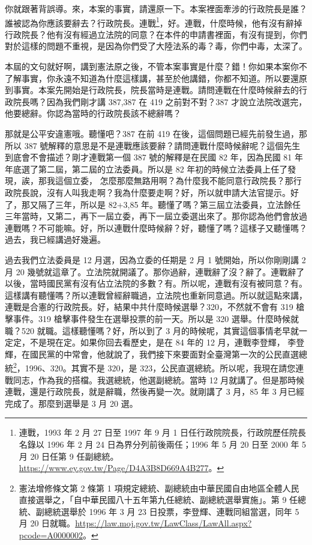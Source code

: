 \hypertarget{c08:cue:56}{}你就跟著背誤導。來，本案的事實，請還原一下。本案裡面牽涉的行政院長是誰？誰被認為你應該要辭去？行政院長。連戰\footnote{連戰，1993 年 2 月 27 日至 1997 年 9 月 1 日任行政院院長，行政院歷任院長名錄以 1996 年 2 月 24 日為界分列前後兩任；1996 年 5 月 20 日至 2000 年 5 月 20 日任第 9 任副總統。\url{https://www.ey.gov.tw/Page/D4A3B8D669A4B277}。}，好。連戰，什麼時候，他有沒有辭掉行政院長？他有沒有經過立法院的同意？在本件的申請書裡面，有沒有提到，你們對於這樣的問題不重視，是因為你們受了大陸法系的毒？毒，你們中毒，太深了。

\hypertarget{c08:cue:57}{}本屆的文句就好啊，講到憲法原之後，不管本案事實是什麼？錯！你如果本案你不了解事實，你永遠不知道為什麼這樣講，甚至於他講錯，你都不知道。所以要還原到事實。本案先開始是行政院長，院長當時是連戰。請問連戰在什麼時候辭去的行政院長嗎？因為我們剛才講 387,387 在 419 之前對不對？387 才說立法院改選完，他要總辭。你認為當時的行政院長該不總辭嗎？

\hypertarget{c08:cue:58}{}那就是公平安違憲哦。聽懂吧？387 在前 419 在後，這個問題已經先前發生過，那所以 387 號解釋的意思是不是連戰應該要辭？請問連戰什麼時候辭呢？這個先生到底會不會描述？剛才連戰第一個 387 號的解釋是在民國 82 年，因為民國 81 年年底選了第二屆，第二屆的立法委員。所以是 82 年初的時候立法委員上任了發現，誒，那我這個立委，
\hypertarget{c08:cue:59}{}怎麼那麼無路用啊？為什麼我不能同意行政院長？那行政院長說，沒有人叫我走啊？我為什麼要走啊？好，所以就申請大法官提示。好了，那又隔了三年，所以是 82+3,85 年。聽懂了嗎？第三屆立法委員，立法餘任三年當時，又第二，再下一屆立委，再下一屆立委選出來了。那你認為他們會放過連戰嗎？不可能嘛。好，所以連戰什麼時候辭？好，聽懂了嗎？這樣子又聽懂嗎？過去，我已經講過好幾遍。

\hypertarget{c08:cue:60}{}過去我們立法委員是 12 月選，因為立委的任期是 2 月 1 號開始，所以你剛剛講 2 月 20 幾號就這章了。立法院就開議了。那你過辭，連戰辭了沒？辭了。連戰辭了以後，當時國民黨有沒有佔立法院的多數？有。所以呢，連戰有沒有被同意？有。這樣講有聽懂嗎？所以連戰曾經辭職過，立法院也重新同意過。所以就這點來講，
\hypertarget{c08:cue:61}{}連戰是合憲的行政院長。好，結果中共什麼時候選舉？320，不然就不會有 319 槍擊事件。319 槍擊事件發生在選舉投票的前一天。所以是 320 選舉。什麼時候就職？520 就職。這樣聽懂嗎？好，所以到了 3 月的時候呢，其實這個事情老早就一定定，不是現在定。如果你回去看歷史，是在 84 年的 12 月，連戰李登輝，
\hypertarget{c08:cue:62}{}李登輝，在國民黨的中常會，他就說了，我們接下來要面對全臺灣第一次的公民直選總統\footnote{憲法增修條文第 2 條第 1 項規定總統、副總統由中華民國自由地區全體人民直接選舉之，「自中華民國八十五年第九任總統、副總統選舉實施」。第 9 任總統、副總統選舉於 1996 年 3 月 23 日投票，李登輝、連戰同組當選，同年 5 月 20 日就職。\url{https://law.moj.gov.tw/LawClass/LawAll.aspx?pcode=A0000002}。}，1996、320。其實不是 320，是 323，公民直選總統。所以呢，我現在請您連戰同志，作為我的搭檔。我選總統，他選副總統。當時 12 月就講了。但是那時候連戰，還是行政院長，就是辭職，然後再變一次。就剛講了 3 月，85 年 3 月已經完成了。那麼到選舉是 3 月 20 選。

